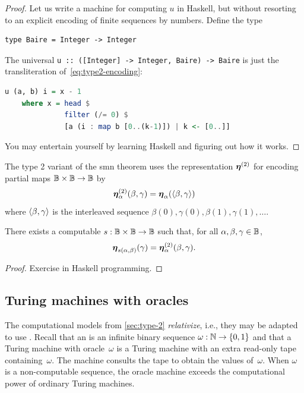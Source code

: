 \begin{proof}
  Let us write a machine for computing $u$ in Haskell, but without
  resorting to an explicit encoding of finite sequences by numbers.
  Define the type
\begin{lstlisting}
type Baire = Integer -> Integer
\end{lstlisting}
  The universal \lstinline!u :: ([Integer] -> Integer, Baire) -> Baire! %
  is just the transliteration of~\eqref{eq:type2-encoding}:
\begin{lstlisting}[language=Haskell]
u (a, b) i = x - 1
    where x = head $
              filter (/= 0) $
              [a (i : map b [0..(k-1)]) | k <- [0..]]
\end{lstlisting}
  You may entertain yourself by learning Haskell and figuring out how
  it works.
\end{proof}

The type 2 variant of the smn theorem uses the representation
$\text{\boldmath{$\eta$}}^{(2)}$ for encoding partial maps $\mathbb{B} \times \mathbb{B} \to
\mathbb{B}$ by
%
\begin{equation*}
  \text{\boldmath{$\eta$}}^{(2)}_{\alpha}(\beta, \gamma) = \text{\boldmath{$\eta$}}_{\alpha}(\langle \beta, \gamma \rangle)
\end{equation*}
%
where $\langle \beta, \gamma \rangle$ is the interleaved sequence $\beta(0), \gamma(0), \beta(1), \gamma(1), \ldots$.

\begin{theorem}
  \label{th:type-2-smd}%
  There exists a computable $s : \mathbb{B} \times \mathbb{B} \to \mathbb{B}$ such
  that, for all $\alpha, \beta, \gamma \in \mathbb{B}$,
  \begin{equation*}
    \text{\boldmath{$\eta$}}_{s(\alpha, \beta)}(\gamma) = \text{\boldmath{$\eta$}}^{(2)}_{\alpha}(\beta, \gamma).
  \end{equation*}
\end{theorem}

\begin{proof}
  Exercise in Haskell programming.
\end{proof}

\subsection{Turing machines with oracles}
\label{sec:turing-machines-with}

The computational models from \ref{sec:type-2} \emph{relativize}, i.e.,
they may be adapted to use . Recall that an  is an infinite binary sequence $\omega : \mathbb{N} \to \{0, 1\}$ and that a Turing machine with oracle~$\omega$ is a Turing machine with an extra read-only tape containing~$\omega$. The machine consults the tape to obtain the values of~$\omega$.
When $\omega$ is a non-computable sequence, the oracle machine exceeds the computational power of ordinary Turing machines.

